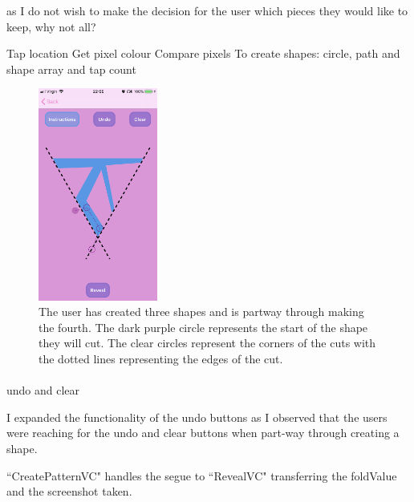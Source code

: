\documentclass[11pt]{article}
\begin{document}
                 as I do not wish to make the decision for the user which pieces they would like to keep, why not all?
                 
                 
                 
            Tap location
            Get pixel colour
            Compare pixels
            To create shapes: circle, path and shape array and tap count
            
            \begin{figure}
                        \centering
                        \includegraphics[width=0.35\textwidth]{KiriZen/createPattern.png}
                        \caption{The user has created three shapes and is partway through making the fourth. The dark purple circle represents the start of the shape they will cut. The clear circles represent the corners of the cuts with the dotted lines representing the edges of the cut.}
                        \label{fig:kiriZen-createPattern}
                    \end{figure}
            
             \paragraph{}
            undo and clear 
            
              I expanded the functionality of the undo buttons as I observed that the users were reaching for the undo and clear buttons when part-way through creating a shape. 
    


``CreatePatternVC" handles the segue to ``RevealVC" transferring the foldValue and the screenshot taken.
\end{document}
